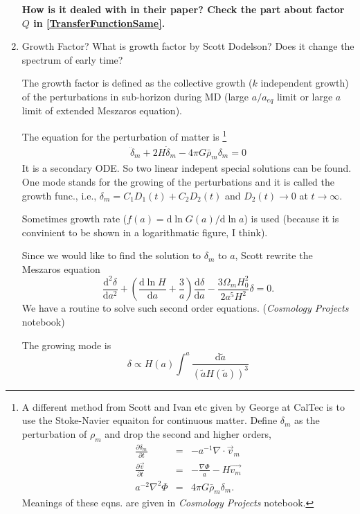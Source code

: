 \documentclass{article}
\begin{document}
\begin{enumerate}
{\bf\color{red} How is it dealed with in their paper? Check the part about factor $Q$ in \ref{TransferFunctionSame}.}

\item
Growth Factor? What is growth factor by Scott Dodelson? Does it change the spectrum of early time?

The growth factor is defined as the collective growth ($k$ independent growth) of the perturbations in sub-horizon during MD (large $a/a_{eq}$ limit or large $a$ limit of extended Meszaros equation).

The equation for the perturbation of matter is 
{\footnote{
A different method from Scott and Ivan etc given by George at CalTec is to use the Stoke-Navier equaiton for continuous matter. Define $\delta_m$ as the perturbation of $\rho_m$ and drop the second and higher orders,
\begin{eqnarray}
\frac{\partial \delta_m}{\partial t}&=&-a^{-1}\nabla\cdot \vec v_m \\
\frac{\partial\vec v}{\partial t}&=&-\frac{\nabla \Phi}{a}-H\vec{ v_m} \\
a^{-2}\nabla^2\Phi&=&4\pi G \bar\rho_m\delta_m    .
\end{eqnarray}
Meanings of these eqns. are given in {\it Cosmology Projects} notebook.
}}
\begin{eqnarray}
\ddot \delta_m + 2H\dot \delta_m - 4\pi G \bar \rho_m \delta_m=0
\end{eqnarray}
It is a secondary ODE. So two linear indepent special solutions can be found. One mode stands for the growing of the perturbations and it is called the growth func., i.e., $\delta_m=C_1D_1(t)+C_2 D_2(t)$ and $D_2(t)\rightarrow 0$ at $t\rightarrow \infty$.

Sometimes growth rate ($f(a)=\mathrm d \ln{G(a)}/\mathrm d\ln a$) is used (because it is convinient to be shown in a logarithmatic figure, I think).

Since we would like to find the solution to $\delta_m$ to $a$, Scott rewrite the Meszaros equation
\begin{equation}
\frac{\mathrm d^2\delta}{\mathrm d a^2}+(\frac{\mathrm d \ln H}{\mathrm d a}+\frac{3}{a})\frac{\mathrm d \delta}{\mathrm d a}-\frac{3\Omega_m H_0^2}{2a^5 H^2}\delta=0    .
\end{equation}
We have a routine to solve such second order equations. ({\it Cosmology Projects} notebook)

The growing mode is
\begin{equation}
\delta\propto H(a)\int^a \frac{\mathrm d \tilde{a}}{(\tilde a H(\tilde a))^3}
\end{equation}


\end{enumerate}
\end{document}
